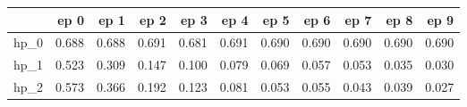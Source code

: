 \begin{tabular}{lrrrrrrrrrr}
\toprule
{} &   ep 0 &   ep 1 &   ep 2 &   ep 3 &   ep 4 &   ep 5 &   ep 6 &   ep 7 &   ep 8 &   ep 9 \\
\midrule
hp\_0 &  0.688 &  0.688 &  0.691 &  0.681 &  0.691 &  0.690 &  0.690 &  0.690 &  0.690 &  0.690 \\
hp\_1 &  0.523 &  0.309 &  0.147 &  0.100 &  0.079 &  0.069 &  0.057 &  0.053 &  0.035 &  0.030 \\
hp\_2 &  0.573 &  0.366 &  0.192 &  0.123 &  0.081 &  0.053 &  0.055 &  0.043 &  0.039 &  0.027 \\
\bottomrule
\end{tabular}
